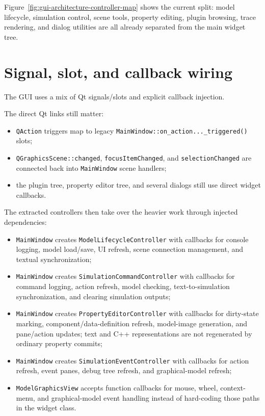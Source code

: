 Figure~\ref{fig:gui-architecture-controller-map} shows the current split: model lifecycle, simulation control, scene tools, property editing, plugin browsing, trace rendering, and dialog utilities are all already separated from the main widget tree.

\section{Signal, slot, and callback wiring}
\label{sec:gui-architecture-signals}

The GUI uses a mix of Qt signals/slots and explicit callback injection.

The direct Qt links still matter:
\begin{itemize}
\item \texttt{QAction} triggers map to legacy \texttt{MainWindow::on\_action...\_triggered()} slots;
\item \texttt{QGraphicsScene::changed}, \texttt{focusItemChanged}, and \texttt{selectionChanged} are connected back into \texttt{MainWindow} scene handlers;
\item the plugin tree, property editor tree, and several dialogs still use direct widget callbacks.
\end{itemize}

The extracted controllers then take over the heavier work through injected dependencies:
\begin{itemize}
\item \texttt{MainWindow} creates \texttt{ModelLifecycleController} with callbacks for console logging, model load/save, UI refresh, scene connection management, and textual synchronization;
\item \texttt{MainWindow} creates \texttt{SimulationCommandController} with callbacks for command logging, action refresh, model checking, text-to-simulation synchronization, and clearing simulation outputs;
\item \texttt{MainWindow} creates \texttt{PropertyEditorController} with callbacks for dirty-state marking, component/data-definition refresh, model-image generation, and pane/action updates; text and C++ representations are not regenerated by ordinary property commits;
\item \texttt{MainWindow} creates \texttt{SimulationEventController} with callbacks for action refresh, event panes, debug tree refresh, and graphical-model refresh;
\item \texttt{ModelGraphicsView} accepts function callbacks for mouse, wheel, context-menu, and graphical-model event handling instead of hard-coding those paths in the widget class.
\end{itemize}

